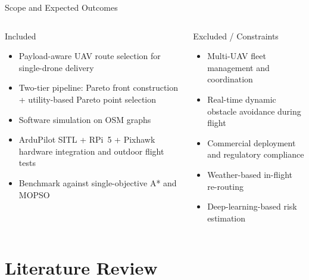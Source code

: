 \documentclass[aspectratio=169,11pt]{beamer}
\begin{document}
\begin{frame}{Scope and Expected Outcomes}
  \begin{columns}[T,onlytextwidth]
      \begin{block}{Included}
        \begin{itemize}
          \item Payload-aware UAV route selection for single-drone delivery
          \item Two-tier pipeline: Pareto front construction + utility-based
                Pareto point selection
          \item Software simulation on OSM graphs
          \item ArduPilot SITL + RPi~5 + Pixhawk hardware integration and
                outdoor flight tests
          \item Benchmark against single-objective A* and MOPSO
        \end{itemize}
      \end{block}
      \begin{block}{Excluded / Constraints}
        \begin{itemize}
          \item Multi-UAV fleet management and coordination
          \item Real-time dynamic obstacle avoidance during flight
          \item Commercial deployment and regulatory compliance
          \item Weather-based in-flight re-routing
          \item Deep-learning-based risk estimation
        \end{itemize}
      \end{block}
  \end{columns}
\end{frame}

\section{Literature Review}
\end{document}
